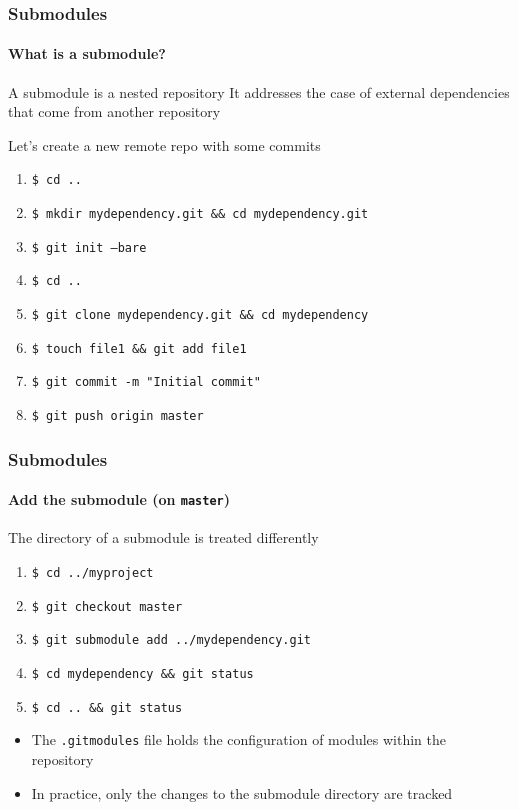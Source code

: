\begin{frame}
\frametitle{Submodules}
\framesubtitle{What is a submodule?}

\begin{block}{A submodule is a nested repository}
It addresses the case of external dependencies that come from another repository
\end{block}
\pause

\begin{block}{Let's create a new remote repo with some commits}
\begin{enumerate}
\item \texttt{\$ cd ..}
\item \texttt{\$ mkdir mydependency.git \&\& cd mydependency.git}
\item \texttt{\$ git init ---bare}
\item \texttt{\$ cd ..}
\item \texttt{\$ git clone mydependency.git \&\& cd mydependency}
\item \texttt{\$ touch file1 \&\& git add file1}
\item \texttt{\$ git commit -m "Initial commit"}
\item \texttt{\$ git push origin master}
\end{enumerate}
\end{block}

\end{frame}

\begin{frame}
\frametitle{Submodules}
\framesubtitle{Add the submodule (on \texttt{master})}

\begin{block}{The directory of a submodule is treated differently}
\begin{enumerate}
\item \texttt{\$ cd ../myproject}
\item \texttt{\$ git checkout master}
\item \texttt{\$ git submodule add ../mydependency.git}
\item \texttt{\$ cd mydependency \&\& git status}
\item \texttt{\$ cd .. \&\& git status}
\end{enumerate}
\begin{itemize}
\item The \texttt{.gitmodules} file holds the configuration of modules within the repository
\item In practice, only the changes to the submodule directory are tracked
\end{itemize}
\end{block}
\end{frame}

